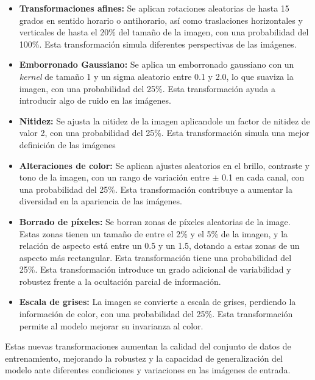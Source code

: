 \begin{itemize}
	\item \textbf{Transformaciones afines:} Se aplican rotaciones aleatorias de hasta 15 grados en sentido horario o antihorario, así como traslaciones horizontales y verticales de hasta el 20\% del tamaño de la imagen, con una probabilidad del 100\%. Esta transformación simula diferentes perspectivas de las imágenes.
	\item \textbf{Emborronado Gaussiano:} Se aplica un emborronado gaussiano con un \textit{kernel} de tamaño 1 y un sigma aleatorio entre 0.1 y 2.0, lo que suaviza la imagen, con una probabilidad del 25\%. Esta transformación ayuda a introducir algo de ruido en las imágenes.
	\item \textbf{Nitidez:} Se ajusta la nitidez de la imagen aplicandole un factor de nitidez de valor 2, con una probabilidad del 25\%. Esta transformación simula una mejor definición de las imágenes
	\item \textbf{Alteraciones de color:} Se aplican ajustes aleatorios en el brillo, contraste y tono de la imagen, con un rango de variación entre $\pm$ 0.1 en cada canal, con una probabilidad del 25\%. Esta transformación contribuye a aumentar la diversidad en la apariencia de las imágenes.
	\item \textbf{Borrado de píxeles:} Se borran zonas de píxeles aleatorias de la image. Estas zonas tienen un tamaño de entre el 2\% y el 5\% de la imagen, y la relación de aspecto está entre un 0.5 y un 1.5, dotando a estas zonas de un aspecto más rectangular. Esta transformación tiene una probabilidad del 25\%. Esta transformación introduce un grado adicional de variabilidad y robustez frente a la ocultación parcial de información.
	\item \textbf{Escala de grises:} La imagen se convierte a escala de grises, perdiendo la información de color, con una probabilidad del 25\%. Esta transformación permite al modelo mejorar su invarianza al color.
\end{itemize}

Estas nuevas transformaciones aumentan la calidad del conjunto de datos de entrenamiento, mejorando la robustez y la capacidad de generalización del modelo ante diferentes condiciones y variaciones en las imágenes de entrada.

